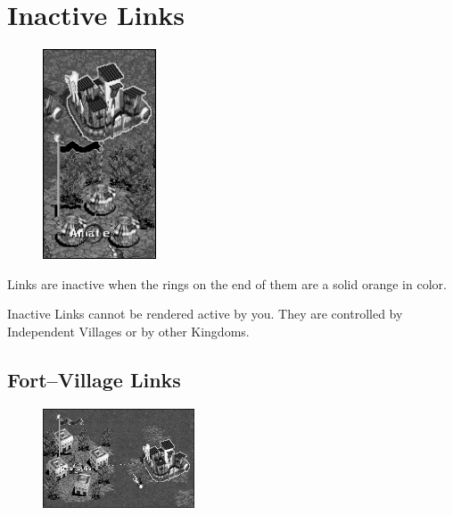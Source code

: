 
\section{Inactive Links}

\begin{figure}
	\vspace{-20pt}
	\begin{center}
		\includegraphics[width=0.3\textwidth]{Iinactivelink}
	\end{center}
	\vspace{-20pt}
\end{figure}

Links are inactive when the rings on the end of them are a solid orange in color.

Inactive Links cannot be rendered active by you. They are controlled by Independent Villages or by other Kingdoms. 

\clearpage

\subsection{Fort–Village Links}

\begin{figure}
	\vspace{-20pt}
	\begin{center}
		\includegraphics[width=0.4\textwidth]{Iactivelink_fort}
	\end{center}
	\vspace{-20pt}
\end{figure}

